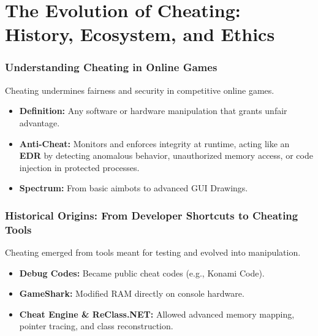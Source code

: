 \documentclass[aspectratio=169]{beamer}
\begin{document}

\section{The Evolution of Cheating: History, Ecosystem, and Ethics}
\begin{frame}
    \frametitle{Understanding Cheating in Online Games}
    Cheating undermines fairness and security in competitive online games.
    \vspace{0.4cm}
    \begin{itemize}
        \item \textbf{Definition:} Any software or hardware manipulation that grants unfair advantage.
        \pause
        \item \textbf{Anti-Cheat:} Monitors and enforces integrity at runtime, acting like an \textbf{EDR} by detecting anomalous behavior, unauthorized memory access, or code injection in protected processes.
        \pause
        \item \textbf{Spectrum:} From basic aimbots to advanced GUI Drawings.
 
    \end{itemize}
\end{frame}

\begin{frame}
    \frametitle{Historical Origins: From Developer Shortcuts to Cheating Tools}
    Cheating emerged from tools meant for testing and evolved into manipulation.
    \vspace{0.4cm}
    \begin{itemize}
        \item \textbf{Debug Codes:} Became public cheat codes (e.g., Konami Code).
        \pause
        \item \textbf{GameShark:} Modified RAM directly on console hardware.
        \pause
        \item \textbf{Cheat Engine \& ReClass.NET:} Allowed advanced memory mapping, pointer tracing, and class reconstruction.
    \end{itemize}
\end{frame}
\end{document}

